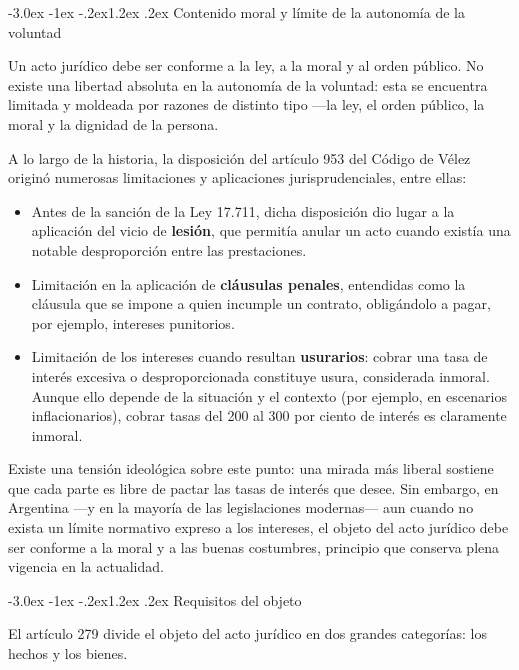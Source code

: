 \documentclass[12pt,oneside]{book}
\makeatletter
\renewcommand\section{\@startsection{section}{1}{\z@}%
  {-3.0ex \@plus -1ex \@minus -.2ex}{1.2ex \@plus .2ex}%
  {\normalfont\large\bfseries\color{acento}}}
\makeatother
\begin{document}
\section{Contenido moral y límite de la autonomía de la voluntad}

Un acto jurídico debe ser conforme a la ley, a la moral y al orden público. No existe una libertad absoluta en la autonomía de la voluntad: esta se encuentra limitada y moldeada por razones de distinto tipo ---la ley, el orden público, la moral y la dignidad de la persona.

\begin{nota}
A lo largo de la historia, la disposición del artículo 953 del Código de Vélez originó numerosas limitaciones y aplicaciones jurisprudenciales, entre ellas:
\begin{itemize}
    \item Antes de la sanción de la Ley 17.711, dicha disposición dio lugar a la aplicación del vicio de \textbf{lesión}, que permitía anular un acto cuando existía una notable desproporción entre las prestaciones.
    \item Limitación en la aplicación de \textbf{cláusulas penales}, entendidas como la cláusula que se impone a quien incumple un contrato, obligándolo a pagar, por ejemplo, intereses punitorios.
    \item Limitación de los intereses cuando resultan \textbf{usurarios}: cobrar una tasa de interés excesiva o desproporcionada constituye usura, considerada inmoral. Aunque ello depende de la situación y el contexto (por ejemplo, en escenarios inflacionarios), cobrar tasas del 200 al 300 por ciento de interés es claramente inmoral.
\end{itemize}
\end{nota}

Existe una tensión ideológica sobre este punto: una mirada más liberal sostiene que cada parte es libre de pactar las tasas de interés que desee. Sin embargo, en Argentina ---y en la mayoría de las legislaciones modernas--- aun cuando no exista un límite normativo expreso a los intereses, el objeto del acto jurídico debe ser conforme a la moral y a las buenas costumbres, principio que conserva plena vigencia en la actualidad.

\section{Requisitos del objeto}

El artículo 279 divide el objeto del acto jurídico en dos grandes categorías: los hechos y los bienes.
\end{document}
